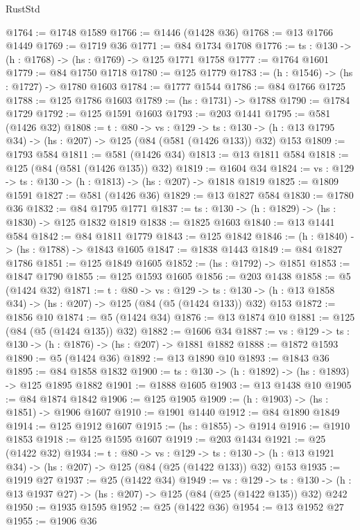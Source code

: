 \begin{lexlean}{RustStd}
\begin{coremodule}
{\begin{coremodule}
{{{{{{{{{{{{{{{@1764 := @1748 @1589
@1766 := @1446 (@1428 @36)
@1768 := @13 @1766 @1449
@1769 := @1719 @36
@1771 := @84 @1734 @1708
@1776 := {ts : @130} -> (h : @1768) -> (hs : @1769) -> @125 @1771 @1758
@1777 := @1764 @1601
@1779 := @84 @1750 @1718
@1780 := @125 @1779
@1783 := (h : @1546) -> (hs : @1727) -> @1780 @1603
@1784 := @1777 @1544
@1786 := @84 @1766 @1725
@1788 := @125 @1786 @1603
@1789 := (hs : @1731) -> @1788
@1790 := @1784 @1729
@1792 := @125 @1591 @1603
@1793 := @203 @1441
@1795 := @581 (@1426 @32)
@1808 := {t : @80} ->
  {vs : @129} ->
  {ts : @130} -> (h : @13 @1795 @34) -> (hs : @207) -> @125 (@84 (@581 (@1426 @133)) @32) @153
@1809 := @1793 @584
@1811 := @581 (@1426 @34)
@1813 := @13 @1811 @584
@1818 := @125 (@84 (@581 (@1426 @135)) @32)
@1819 := @1604 @34
@1824 := {vs : @129} -> {ts : @130} -> (h : @1813) -> (hs : @207) -> @1818 @1819
@1825 := @1809 @1591
@1827 := @581 (@1426 @36)
@1829 := @13 @1827 @584
@1830 := @1780 @36
@1832 := @84 @1795 @1771
@1837 := {ts : @130} -> (h : @1829) -> (hs : @1830) -> @125 @1832 @1819
@1838 := @1825 @1603
@1840 := @13 @1441 @584
@1842 := @84 @1811 @1779
@1843 := @125 @1842
@1846 := (h : @1840) -> (hs : @1788) -> @1843 @1605
@1847 := @1838 @1443
@1849 := @84 @1827 @1786
@1851 := @125 @1849 @1605
@1852 := (hs : @1792) -> @1851
@1853 := @1847 @1790
@1855 := @125 @1593 @1605
@1856 := @203 @1438
@1858 := @5 (@1424 @32)
@1871 := {t : @80} ->
  {vs : @129} ->
  {ts : @130} -> (h : @13 @1858 @34) -> (hs : @207) -> @125 (@84 (@5 (@1424 @133)) @32) @153
@1872 := @1856 @10
@1874 := @5 (@1424 @34)
@1876 := @13 @1874 @10
@1881 := @125 (@84 (@5 (@1424 @135)) @32)
@1882 := @1606 @34
@1887 := {vs : @129} -> {ts : @130} -> (h : @1876) -> (hs : @207) -> @1881 @1882
@1888 := @1872 @1593
@1890 := @5 (@1424 @36)
@1892 := @13 @1890 @10
@1893 := @1843 @36
@1895 := @84 @1858 @1832
@1900 := {ts : @130} -> (h : @1892) -> (hs : @1893) -> @125 @1895 @1882
@1901 := @1888 @1605
@1903 := @13 @1438 @10
@1905 := @84 @1874 @1842
@1906 := @125 @1905
@1909 := (h : @1903) -> (hs : @1851) -> @1906 @1607
@1910 := @1901 @1440
@1912 := @84 @1890 @1849
@1914 := @125 @1912 @1607
@1915 := (hs : @1855) -> @1914
@1916 := @1910 @1853
@1918 := @125 @1595 @1607
@1919 := @203 @1434
@1921 := @25 (@1422 @32)
@1934 := {t : @80} ->
  {vs : @129} ->
  {ts : @130} -> (h : @13 @1921 @34) -> (hs : @207) -> @125 (@84 (@25 (@1422 @133)) @32) @153
@1935 := @1919 @27
@1937 := @25 (@1422 @34)
@1949 := {vs : @129} ->
  {ts : @130} -> (h : @13 @1937 @27) -> (hs : @207) -> @125 (@84 (@25 (@1422 @135)) @32) @242
@1950 := @1935 @1595
@1952 := @25 (@1422 @36)
@1954 := @13 @1952 @27
@1955 := @1906 @36
}}}}}}}}}}}}}}}
\end{coremodule}}
\end{coremodule}
\end{lexlean}
